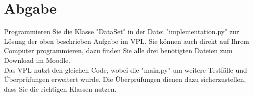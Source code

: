 \documentclass[
	12pt,
	a4paper,
	parskip=full
]{article}
\begin{document}
	\section{Abgabe}
		Programmieren Sie die Klasse "DataSet" in der Datei "implementation.py" zur Lösung der oben beschrieben Aufgabe im VPL.
		Sie können auch direkt auf Ihrem Computer programmieren, dazu finden Sie alle drei benötigten Dateien zum Download im Moodle.
		\\
		Das VPL nutzt den gleichen Code, wobei die "main.py" um weitere Testfälle und Überprüfungen erweitert wurde.
		Die Überprüfungen dienen dazu sicherzustellen, dass Sie die richtigen Klassen nutzen.

		
\end{document}
